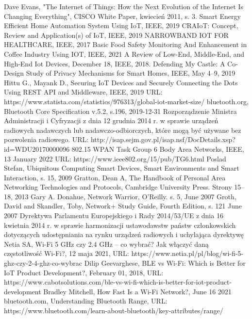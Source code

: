 \documentclass[12pt, twoside, openany]{mwrep}
\begin{document}
\begin{thebibliography}{99}
\bibitem[1]{} Dave Evans, "The Internet of Things: How the Next Evolution of the Internet Is Changing Everything", CISCO White Paper, kwiecień 2011, s. 3.
\bibitem[2]{} Smart Energy Efficient Home Automation System Using IoT, IEEE, 2019
\bibitem[3]{} CRAIoT: Concept, Review and Application(s) of IoT, IEEE, 2019
\bibitem[4]{} NARROWBAND IOT FOR HEALTHCARE, IEEE, 2017
\bibitem[5]{} Basic Food Safety Monitoring And Enhancement in Coffee Industry Using IOT, IEEE, 2021
\bibitem[6]{} A Review of Low-End, Middle-End, and High-End Iot Devices, December 18, IEEE, 2018.
\bibitem[7]{} Defending My Castle: A Co-Design Study of Privacy Mechanisms for Smart Homes, IEEE, May 4–9, 2019
\bibitem[8]{} Hittu G., Mayank D., Securing IoT Devices and Securely Connecting the
Dots Using REST API and Middleware, IEEE, 2019
\bibitem[9]{} URL: https://www.statista.com/statistics/976313/global-iot-market-size/
\bibitem[10]{} bluetooth.org, Bluetooth Core Specification v.5.2, s.196, 2019-12-31
\bibitem[11]{} Rozporządzenie Ministra Administracji i Cyfryzacji z dnia 12 grudnia 2014 r. w sprawie urządzeń radiowych nadawczych lub nadawczo-odbiorczych, które mogą być używane bez pozwolenia radiowego. URL: http://isap.sejm.gov.pl/isap.nsf/DocDetails.xsp?id=WDU20170000096
\bibitem[12]{} 802.15 WPAN Task Group 6 Body Area Networks, IEEE, 13 January 2022 URL: https://www.ieee802.org/15/pub/TG6.html
\bibitem[13]{} Poslad Stefan, Ubiquitous Computing Smart Devices, Smart Environments and Smart Interaction, s. 15, 2009
\bibitem[14]{} Gratton, Dean A, The Handbook of Personal Area Networking Technologies and Protocols, Cambridge University Press. Strony 15–18, 2013 
\bibitem[15]{} Gary A. Donahue, Network Warrior, O'Reilly. s. 5, June 2007
\bibitem[16]{} Groth, David and Skandler, Toby, Network+ Study Guide, Fourth Edition, s. 121 June 2007
\bibitem[17]{} Dyrektywa Parlamentu Europejskiego i Rady 2014/53/UE z dnia 16 kwietnia 2014 r. w sprawie harmonizacji ustawodawstw państw członkowskich dotyczących udostępniania na rynku urządzeń radiowych i uchylająca dyrektywę
\bibitem[18]{} Netia SA, Wi-Fi 5 GHz czy 2.4 GHz – co wybrać? Jak włączyć daną częstotliwość Wi-Fi?, 12 maja 2021, URL: https://www.netia.pl/pl/blog/wi-fi-5-ghz-czy-2-4-ghz-co-wybrac
\bibitem[19]{} Dilip Geevarghese, BLE vs Wi-Fi: Which is Better for IoT Product Development?, February 01, 2018, URL:  https://www.cabotsolutions.com/ble-vs-wi-fi-which-is-better-for-iot-product-development
\bibitem[20]{} Bradley Mitchell, How Fast Is a Wi-Fi Network?, June 16 2021
\bibitem[21]{} bluetooth.com, Understanding Bluetooth Range, URL: https://www.bluetooth.com/learn-about-bluetooth/key-attributes/range/

\end{thebibliography}

\listoffigures

\listoftables


\end{document}
